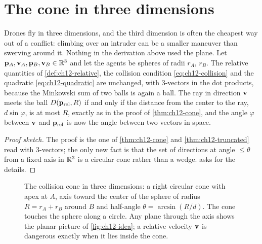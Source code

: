 \section{The cone in three dimensions}
\label{sec:ch12-3d}

Drones fly in three dimensions, and the third dimension is often the cheapest
way out of a conflict: climbing over an intruder can be a smaller maneuver
than swerving around it. Nothing in the derivation above used the plane. Let
$\mathbf{p}_A, \mathbf{v}_A, \mathbf{p}_B, \mathbf{v}_B \in \mathbb{R}^3$ and let the agents be spheres of
radii $r_A$, $r_B$. The relative quantities of \cref{def:ch12-relative}, the
collision condition \cref{eq:ch12-collision} and the quadratic
\cref{eq:ch12-quadratic} are unchanged, with 3-vectors in the dot products,
because the Minkowski sum of two balls is again a ball. The ray in direction
$\mathbf{v}$ meets the ball $D(\mathbf{p}_{\mathrm{rel}},R)$ if and only if the
distance from the center to the ray, $d\sin\varphi$, is at most $R$, exactly as
in the proof of \cref{thm:ch12-cone}, and the angle $\varphi$ between $\mathbf{v}$
and $\mathbf{p}_{\mathrm{rel}}$ is now the angle between two vectors in space.

\begin{proof}[Proof sketch]
The proof is the one of \cref{thm:ch12-cone} and \cref{thm:ch12-truncated}
read with 3-vectors; the only new fact is that the set of directions at angle
$\le \theta$ from a fixed axis in $\mathbb{R}^3$ is a circular cone rather than a
wedge.  asks for the details. \qedhere
\end{proof}

\begin{figure}[tb]
  \centering
  \caption{The collision cone in three dimensions: a right circular cone
  with apex at $A$, axis toward the center of the sphere of radius
  $R = r_A + r_B$ around $B$ and half-angle $\theta = \arcsin(R/d)$. The cone
  touches the sphere along a circle. Any plane through the axis shows the
  planar picture of \cref{fig:ch12-idea}; a relative velocity $\mathbf{v}$ is
  dangerous exactly when it lies inside the cone.}
  \label{fig:ch12-cone3d}
\end{figure}

